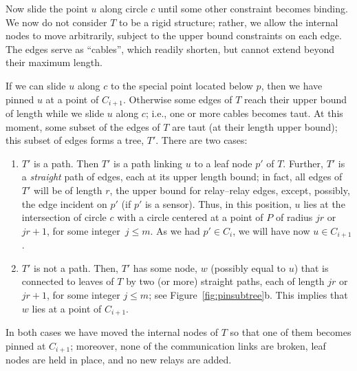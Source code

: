 \documentclass[11pt,a4paper]{article}
\theoremstyle{definition}
\theoremstyle{remark}
\begin{document}
Now slide the point $u$ along circle $c$ until some other constraint becomes binding. We now do not consider $T$ to be a rigid structure; rather, we allow the internal nodes to move arbitrarily, subject to the upper bound constraints on each edge. The edges serve as ``cables'', which readily shorten, but cannot extend beyond their maximum length.

If we can slide $u$ along $c$ to the special point located below $p$, then we have pinned $u$ at a point of $C_{i+1}$. Otherwise some edges of $T$ reach their upper bound of length while we slide $u$ along $c$; i.e., one or more cables becomes taut. At this moment, some subset of the edges of $T$ are taut (at their length upper bound); this subset of edges forms a tree, $T'$. There are two cases:
\begin{enumerate}[label=(\roman*)]
    \item $T'$ is a path. Then $T'$ is a path linking $u$ to a leaf node $p'$ of $T$. Further, $T'$ is a \emph{straight} path of edges, each at its upper length bound; in fact, all edges of $T'$ will be of length $r$, the upper bound for relay--relay edges, except, possibly, the edge incident on $p'$ (if $p'$ is a sensor). Thus, in this position, $u$ lies at the intersection of circle $c$ with a circle centered at a point of $P$ of radius $jr$ or $jr+1$, for some integer~$j \le m$. As we had $p' \in C_i$, we will have now $u \in C_{i+1}$.
    \item $T'$ is not a path. Then, $T'$ has some node, $w$ (possibly equal to $u$) that is connected to leaves of $T$ by two (or more) straight paths, each of length $jr$ or $jr+1$, for some integer $j \le m$; see Figure~\ref{fig:pinsubtree}b. This implies that $w$ lies at a point of $C_{i+1}$.
\end{enumerate}

In both cases we have moved the internal nodes of $T$ so that one of them becomes pinned at $C_{i+1}$; moreover, none of the communication links are broken, leaf nodes are held in place, and no new relays are added.
\end{document}
